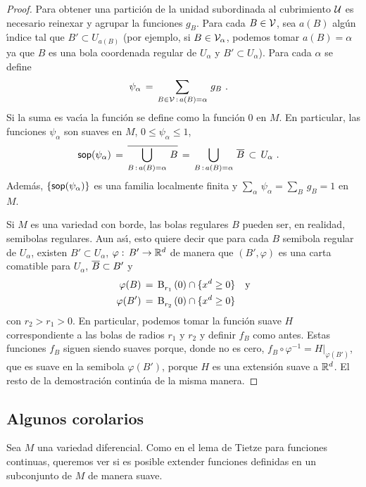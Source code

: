 \begin{proof}
	Para obtener una partici\'{o}n de la unidad subordinada al cubrimiento
	$\cal{U}$ es necesario reinexar y agrupar la funciones $g_{B}$.
	Para cada $B\in\cal{V}$, sea $a(B)$ alg\'{u}n \'{\i}ndice tal que
	$B'\subset U_{a(B)}$ (por ejemplo, si $B\in\cal{V}_{\alpha}$, podemos
	tomar $a(B)=\alpha$ ya que $B$ es una bola coordenada regular de
	$U_{\alpha}$ y $B'\subset U_{\alpha}$). Para cada $\alpha$ se define
	\begin{align*}
		\psi_{\alpha} & \,=\,\sum_{B\in\cal{V}\,:\,a(B)=\alpha}\,g_{B}
		\text{ .}
	\end{align*}
	Si la suma es vac\'{\i}a la funci\'{o}n se define como la funci\'{o}n
	$0$ en $M$. En particular, las funciones $\psi_{\alpha}$ son
	suaves en $M$, $0\leq\psi_{\alpha}\leq 1$,
	\begin{align*}
		\soporte{\psi_{\alpha}} & \,=\,
			\clos{\bigcup_{B\,:\,a(B)=\alpha}\,B}
			\,=\,\bigcup_{B\,:\,a(B)=\alpha}\,\clos{B}
			\,\subset\, U_{\alpha}
		\text{ .}
	\end{align*}
	Adem\'{a}s, $\{\soporte{\psi_{\alpha}}\}$ es una familia localmente
	finita y $\sum_{\alpha}\,\psi_{\alpha}=\sum_{B}\,g_{B}=1$ en $M$.

	Si $M$ es una variedad con borde, las bolas regulares $B$ pueden
	ser, en realidad, semibolas regulares. Aun as\'{\i}, esto quiere
	decir que para cada $B$ semibola regular de $U_{\alpha}$,
	existen $B'\subset U_{\alpha}$, $\varphi:\,B'\rightarrow\bb{R}^{d}$
	de manera que $(B',\varphi)$ es una carta comatible para $U_{\alpha}$,
	$\clos{B}\subset B'$ y
	\begin{align*}
		\varphi(B) & \,=\,\bola{r_{1}}{0}\cap\{x^{d}\geq 0\}
		\quad\text{y} \\
		\varphi(B') & \,=\,\bola{r_{2}}{0}\cap\{x^{d}\geq 0\}
	\end{align*}
	con $r_{2}>r_{1}>0$. En particular, podemos tomar la funci\'{o}n
	suave $H$ correspondiente a las bolas de radios $r_{1}$ y $r_{2}$
	y definir $f_{B}$ como antes. Estas funciones $f_{B}$ siguen siendo
	suaves porque, donde no es cero,
	$f_{B}\circ\varphi^{-1}=H|_{\varphi(B')}$, que es suave en la semibola
	$\varphi(B')$, porque $H$ es una extensi\'{o}n suave a $\bb{R}^{d}$.
	El resto de la demostraci\'{o}n contin\'{u}a de la misma manera.
\end{proof}

\subsection{Algunos corolarios}
Sea $M$ una variedad diferencial. Como en el lema de Tietze para funciones
continuas, queremos ver si es posible extender funciones definidas en un
subconjunto de $M$ de manera suave.

